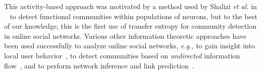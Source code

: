\DIFdelbegin %

\DIFdelend This activity-based approach was motivated by a method used by Shalizi \emph{et al.} in ~\cite{shalizi2007discovering} to detect functional communities within populations of neurons, but to the best of our knowledge, this is the first use of transfer entropy for community detection in online social networks. Various other information theoretic approaches have been used successfully to analyze online social networks, \emph{e.g.,} to gain insight into local user behavior~\cite{darmon2013understanding}, to detect communities based on \emph{undirected} information flow~\cite{darmon2013detecting}, and to perform network inference and link prediction~\cite{ver2012information}.


